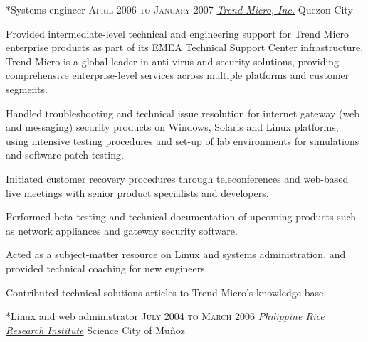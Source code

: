 \documentclass[10pt, a4paper, final]{article}
\begin{document}
\begin{section}
\begin{subsection}
\begin{compactitem}
    \end{compactitem}
  \end{subsection}
  \vspace{1.5em}

  \begin{subsection}*{Systems engineer \hfill\textsc{April 2006 to January 2007}}
    \href{http://www.trendmicro.com}{\textit{Trend Micro, Inc.}} \hfill Quezon City
    \vspace{1em}

    Provided intermediate-level technical and engineering support for Trend Micro enterprise products as part of its EMEA Technical Support Center infrastructure. Trend Micro is a global leader in anti-virus and security solutions, providing comprehensive enterprise-level services across multiple platforms and customer segments.
    \vspace{1em}
    \begin{compactitem}
      \item Handled troubleshooting and technical issue resolution for internet gateway (web and messaging) security products on Windows, Solaris and Linux platforms, using intensive testing procedures and set-up of lab environments for simulations and software patch testing.
      \item Initiated customer recovery procedures through teleconferences and web-based live meetings with senior product specialists and developers.
      \item Performed beta testing and technical documentation of upcoming products such as network appliances and gateway security software.
      \item Acted as a subject-matter resource on Linux and systems administration, and provided technical coaching for new engineers.
      \item Contributed technical solutions articles to Trend Micro's knowledge base.
      
    \end{compactitem}
  \end{subsection}
  \vspace{1.5em}

  \begin{subsection}*{Linux and web administrator \hfill\textsc{July 2004 to March 2006}}
    \href{http://www.philrice.gov.ph}{\textit{Philippine Rice Research Institute}} \hfill Science City of Mu{\~n}oz
    \vspace{1em}


\end{subsection}
\end{section}
\end{document}
